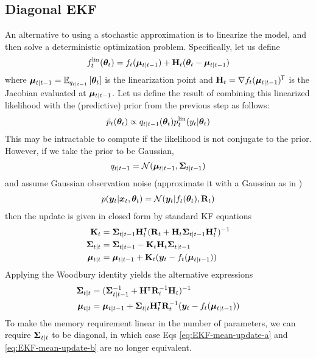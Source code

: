 
\subsection{Diagonal EKF}

An alternative to using a stochastic approximation is to linearize the model, and then solve a deterministic optimization problem.
Specifically, let us define
\begin{align}
f_t^{\lin}(\vtheta_t)
 = f_t(\vmu_{t|t-1})
  + \vH_t
  (\vtheta_t - \vmu_{t|t-1})
\end{align}
where $\vmu_{t|t-1} = \expectQ{\vtheta_t}{q_{t|t-1}}$
is the linearization point and $\vH_t = \nabla f_t(\vmu_{t|t-1})^\trans$ is the Jacobian evaluated at $\vmu_{t|t-1}$.
Let us define the result of combining this linearized
likelihood with the (predictive) prior from the previous step
as follows:
\begin{align}
\hat{p}_t(\vtheta_t) \propto 
q_{t|t-1}(\vtheta_t) p_t^{\lin}(y_t|\vtheta_t)
\end{align}
This may be intractable to compute if the likelihood is not conjugate to the prior.
However, if we take the prior to be Gaussian,
\begin{align}
    q_{t\vert t-1} = \gauss(\vmu_{t\vert t-1},\vSigma_{t\vert t-1})
\end{align}
and assume Gaussian observation noise (approximate it with a Gaussian as in \citep{Ollivier2018})
\begin{align}
    p(\vy_t\vert \vx_t,\vtheta_t) = \gauss(\vy_t\vert f_t(\vtheta_t),\vR_t)
\end{align}
then the update is given in closed form by standard KF equations
\begin{align}
    \vK_t &= \vSigma_{t\vert t-1}\vH_t^\T(\vR_t+\vH_t\vSigma_{t\vert t-1}\vH_t^\T)^{-1} \\
    \vSigma_{t|t} &= \vSigma_{t\vert t-1} - \vK_t \vH_t \vSigma_{t\vert t-1} \label{eq:FC-EKF-var-update} \\
    \vmu_{t\vert t} &= \vmu_{t\vert t-1} + \vK_t (\vy_t-f_t(\vmu_{t\vert t-1})) \label{eq:EKF-mean-update-a}
\end{align}
Applying the Woodbury identity yields the alternative expressions
\begin{align}
    \vSigma_{t|t} &= (\vSigma_{t\vert t-1}^{-1} + \vH^\T \vR_t^{-1} \vH_t)^{-1} \label{eq:FC-EKF-prec-update} \\
    \vmu_{t\vert t} &= \vmu_{t\vert t-1} + \vSigma_{t\vert t} \vH_t^\T \vR_t^{-1} (\vy_t-f_t(\vmu_{t\vert t-1})) \label{eq:EKF-mean-update-b}
\end{align}
To make the memory requirement linear in the number of parameters, we can require $\vSigma_{t\vert t}$ to be diagonal, in which case Eqs \eqref{eq:EKF-mean-update-a} and \eqref{eq:EKF-mean-update-b} are no longer equivalent.

